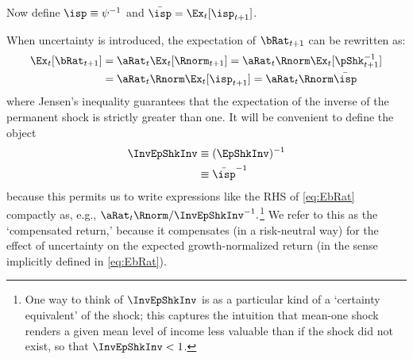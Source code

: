 \documentclass[BufferStockTheory]{subfiles}
\begin{document}
Now define $\isp \equiv \psi^{-1}$ and $\bar{\isp} = \Ex_{t}[\isp_{t+1}]$.  %


When uncertainty is introduced, the expectation of $\bRat_{t+1}$ can be rewritten as:  
\begin{equation}\begin{gathered}\begin{aligned}
  \Ex_{t}[\bRat_{t+1}]  & =  \aRat_{t}\Ex_{t}[\Rnorm_{t+1}] = \aRat_{t}\Rnorm\Ex_{t}[\pShk_{t+1}^{-1}] \label{eq:EbRat}
  \\ & = \aRat_{t}\Rnorm\Ex_{t}[\isp_{t+1}] = \aRat_{t}\Rnorm\bar{\isp}  \notag %
\end{aligned}\end{gathered}\end{equation}
where Jensen's inequality guarantees that the expectation of the inverse of the permanent
shock is strictly greater than one.  It will be convenient to define the object \hypertarget{InvEpShkInv}{}
\begin{align*}
  \InvEpShkInv  & \equiv  (\EpShkInv)^{-1}
  \\ &                  \equiv \bar{\isp}^{-1}  %
\end{align*}
because this permits us to write expressions like the RHS of
\eqref{eq:EbRat} compactly as, e.g., $\aRat_{t}\Rnorm/
\InvEpShkInv^{-1}.$\footnote{One way to think of $\InvEpShkInv$ is as
  a particular kind of a `certainty equivalent' of the shock; this
  captures the intuition that mean-one shock renders a given mean
  level of income less valuable than if the shock did not exist, so
  that $\InvEpShkInv < 1$.}  We refer to this as the `compensated return,' because it compensates (in a risk-neutral way) for the effect of
uncertainty on the expected growth-normalized return (in the sense implicitly defined in
\eqref{eq:EbRat}).
\end{document}
